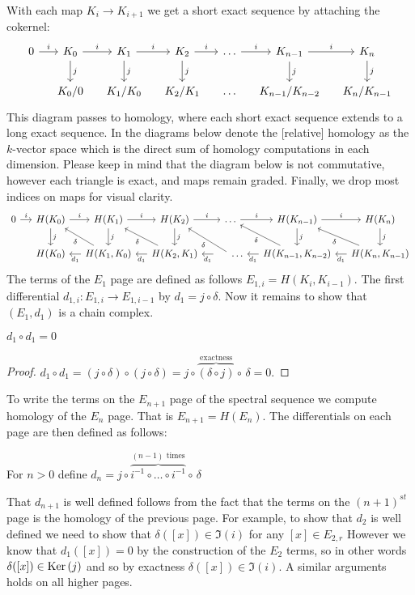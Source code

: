 \noindent With each map $K_i \rightarrow K_{i+1}$ we get a short exact sequence by attaching the cokernel:
\[
\begin{tikzcd} [column sep=small]
0 \arrow{r}{i} & \K_0 \arrow{r}{i}\arrow{d}{j} & \K_1 \arrow{r}{i}\arrow{d}{j}   & \K_2 \arrow{r}{i}\arrow{d}{j} & \ldots \arrow{r}{i} & \K_{n-1} \arrow{r}{i} \arrow{d}{j} & \K_n\arrow{d}{j} \\ 		&     \K_0/{0} &			 \K_1/{\K_0} & 	 \K_2/{\K_{1}}		   & \ldots  			   & \K_{n-1}/{\K_{n-2}}		 & \K_n/{\K_{n-1}} 
\end{tikzcd}
\]
This diagram passes to homology, where each short exact sequence extends to a long exact sequence. In the diagrams below denote the [relative] homology as the $k$-vector space which is the direct sum of homology computations in each dimension. Please keep in mind that the diagram below is not commutative, however each triangle is exact, and maps remain graded. Finally, we drop most indices on maps for visual clarity.
\[
\begin{tikzcd}[column sep=small]
0 \arrow{r}{i} & H(\K_0 \arrow{r}{i}\arrow{d}{j}) & H(\K_1 \arrow{r}{i}\arrow{d}{j})   & H(\K_2 \arrow{r}{i}\arrow{d}{j}) & \ldots \arrow{r}{i} & H(\K_{n-1}) \arrow{r}{i} \arrow{d}{j} & H(\K_n\arrow{d}{j}) \\ 		
&     H(\K_0) &			\arrow{l}{d_{1}} \arrow{ul}{\delta}  H(\K_1, {\K_0}) & 	\arrow{l}{d_{1}} \arrow{ul}{\delta} H(\K_2, {\K_{1}})		   & \arrow{l}{d_{1}} \arrow{ul}{\delta} \hspace{.5cm} \ldots  			   &\arrow{l}{d_{1}}\arrow{ul}{\delta}H(\K_{n-1}, {\K_{n-2}})		 & \arrow{l}{d_{1}} \arrow{ul}{\delta} H(\K_n, {\K_{n-1}})
\end{tikzcd}
\]
The terms of the $E_1$ page are defined as follows $E_{1,i} = H(K_i, K_{i-1})$.  The first differential $d_{1,i}: E_{1,i} \rightarrow E_{1,{i-1}}$ by $d_1 = j \circ \delta$. Now it remains to show that $(E_1, d_1)$ is a chain complex.
\begin{lemma} $d_1 \circ d_1 = 0$ \end{lemma} 
\begin{proof}
$d_1 \circ d_1 = (j \circ \delta) \circ (j \circ \delta) = j \circ \overbrace{(\delta \circ j)}^{\textrm{exactness}} \circ\, \delta = 0.$
\end{proof}
To write the terms on the $E_{n+1}$ page of the spectral sequence we compute homology of the $E_{n}$ page. 
That is $E_{n+1} = H(E_n)$. 
The differentials on each page are then defined as follows:
\begin{definition} For $n > 0$ define $d_n = j \circ \overbrace{i^{-1} \circ \ldots \circ i^{-1}}^{(n-1)\textrm{ times}} \circ\, \delta$
\end{definition}
That $d_{n+1}$ is well defined follows from the fact that the terms on the $(n+1)^{st}$ page is the homology of the previous page. For example, to show that $d_2$ is well defined we need to show that $\delta([x]) \in \Im(i)$ for any $[x] \in E_{2,r}$ However we know that $d_1([x]) = 0$ by the construction of the $E_2$ terms, so in other words $\delta([x]) \in \operatorname{Ker}{(j)}$ and so by exactness $\delta([x]) \in \Im(i)$. A similar arguments holds on all higher pages.

